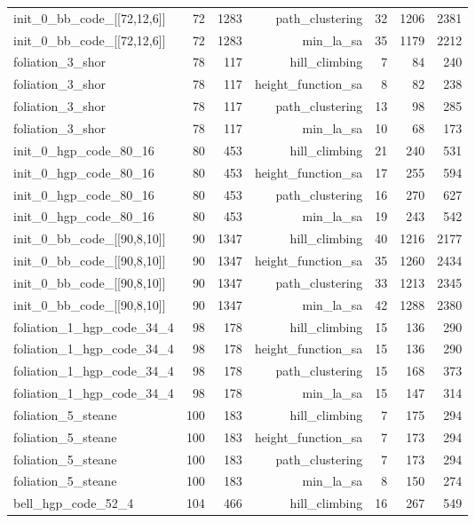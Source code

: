 \begin{longtable}{lrrrrrr}
  init\_0\_bb\_code\_[[72,12,6]] & 72 & 1283 & path\_clustering & 32 & 1206 & 2381 \\
  init\_0\_bb\_code\_[[72,12,6]] & 72 & 1283 & min\_la\_sa & 35 & 1179 & 2212 \\
  foliation\_3\_shor & 78 & 117 & hill\_climbing & 7 & 84 & 240 \\
  foliation\_3\_shor & 78 & 117 & height\_function\_sa & 8 & 82 & 238 \\
  foliation\_3\_shor & 78 & 117 & path\_clustering & 13 & 98 & 285 \\
  foliation\_3\_shor & 78 & 117 & min\_la\_sa & 10 & 68 & 173 \\
  init\_0\_hgp\_code\_80\_16 & 80 & 453 & hill\_climbing & 21 & 240 & 531 \\
  init\_0\_hgp\_code\_80\_16 & 80 & 453 & height\_function\_sa & 17 & 255 & 594 \\
  init\_0\_hgp\_code\_80\_16 & 80 & 453 & path\_clustering & 16 & 270 & 627 \\
  init\_0\_hgp\_code\_80\_16 & 80 & 453 & min\_la\_sa & 19 & 243 & 542 \\
  init\_0\_bb\_code\_[[90,8,10]] & 90 & 1347 & hill\_climbing & 40 & 1216 & 2177 \\
  init\_0\_bb\_code\_[[90,8,10]] & 90 & 1347 & height\_function\_sa & 35 & 1260 & 2434 \\
  init\_0\_bb\_code\_[[90,8,10]] & 90 & 1347 & path\_clustering & 33 & 1213 & 2345 \\
  init\_0\_bb\_code\_[[90,8,10]] & 90 & 1347 & min\_la\_sa & 42 & 1288 & 2380 \\
  foliation\_1\_hgp\_code\_34\_4 & 98 & 178 & hill\_climbing & 15 & 136 & 290 \\
  foliation\_1\_hgp\_code\_34\_4 & 98 & 178 & height\_function\_sa & 15 & 136 & 290 \\
  foliation\_1\_hgp\_code\_34\_4 & 98 & 178 & path\_clustering & 15 & 168 & 373 \\
  foliation\_1\_hgp\_code\_34\_4 & 98 & 178 & min\_la\_sa & 15 & 147 & 314 \\
  foliation\_5\_steane & 100 & 183 & hill\_climbing & 7 & 175 & 294 \\
  foliation\_5\_steane & 100 & 183 & height\_function\_sa & 7 & 173 & 294 \\
  foliation\_5\_steane & 100 & 183 & path\_clustering & 7 & 173 & 294 \\
  foliation\_5\_steane & 100 & 183 & min\_la\_sa & 8 & 150 & 274 \\
  bell\_hgp\_code\_52\_4 & 104 & 466 & hill\_climbing & 16 & 267 & 549 \\

\end{longtable}
